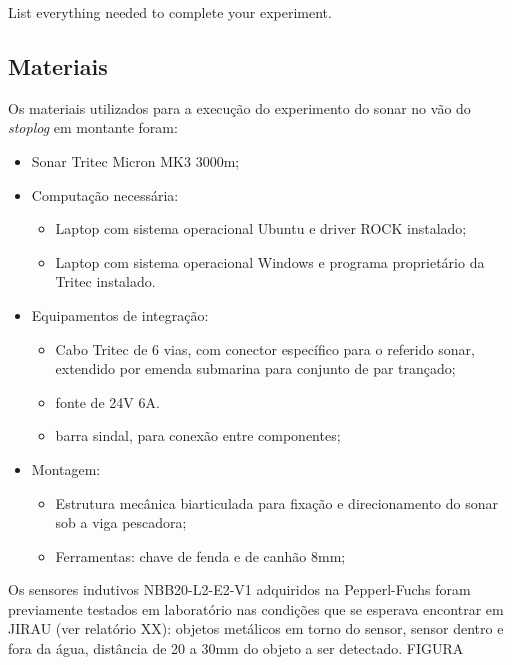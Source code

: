
List everything needed to complete your experiment.


\subsection{Materiais}
\label{materials}
Os materiais utilizados para a execução do experimento do sonar no vão do
\emph{stoplog} em montante foram:
\begin{itemize}
  \item Sonar Tritec Micron MK3 3000m;
  
  \item Computação necessária:
  \begin{itemize}
    \item Laptop com sistema operacional Ubuntu e driver ROCK instalado;
    \item Laptop com sistema operacional Windows e programa proprietário da Tritec instalado.
  \end{itemize}
  
  \item Equipamentos de integração:
  \begin{itemize}
    \item Cabo Tritec de 6 vias, com conector específico para o referido sonar,
  extendido por emenda submarina para conjunto de par trançado;
    \item fonte de 24V 6A.
    \item barra sindal, para conexão entre componentes;
  \end{itemize}
  
  \item Montagem:
  \begin{itemize}
    \item Estrutura mecânica biarticulada para fixação e direcionamento do sonar
  sob a viga pescadora;
    \item Ferramentas: chave de fenda e de canhão 8mm;
  \end{itemize}
\end{itemize}


Os sensores indutivos NBB20-L2-E2-V1 adquiridos na Pepperl-Fuchs foram
previamente testados em laboratório nas condições que se esperava encontrar em JIRAU (ver relatório XX): objetos
metálicos em torno do sensor, sensor dentro e fora da água, distância de 20 a
30mm do objeto a ser detectado. FIGURA

